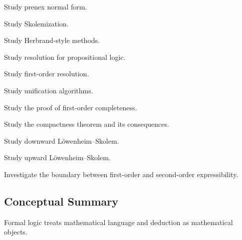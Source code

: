 \begin{exercise}[4]
Study prenex normal form.
\end{exercise}

\begin{exercise}[4]
Study Skolemization.
\end{exercise}

\begin{exercise}[4]
Study Herbrand-style methods.
\end{exercise}

\begin{exercise}[4]
Study resolution for propositional logic.
\end{exercise}

\begin{exercise}[4]
Study first-order resolution.
\end{exercise}

\begin{exercise}[4]
Study unification algorithms.
\end{exercise}

\begin{exercise}[4]
Study the proof of first-order completeness.
\end{exercise}

\begin{exercise}[4]
Study the compactness theorem and its consequences.
\end{exercise}

\begin{exercise}[4]
Study downward Löwenheim--Skolem.
\end{exercise}

\begin{exercise}[4]
Study upward Löwenheim--Skolem.
\end{exercise}

\begin{exercise}[4]
Investigate the boundary between first-order and second-order
expressibility.
\end{exercise}

\subsection{Conceptual Summary}
\label{subsec:formal-logic-summary}

Formal logic treats mathematical language and deduction as mathematical
objects.

